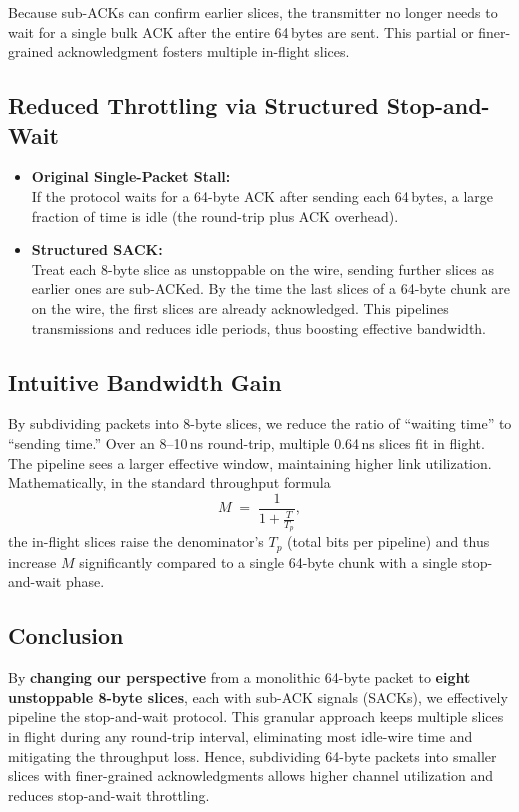 Because sub-ACKs can confirm earlier slices, the transmitter no longer needs to wait for a single bulk ACK after the entire 64\,bytes are sent. This partial or finer-grained acknowledgment fosters multiple in-flight slices.

\subsection{Reduced Throttling via Structured Stop-and-Wait}

\begin{itemize}
\item \textbf{Original Single-Packet Stall:}\\
If the protocol waits for a 64-byte ACK after sending each 64\,bytes, a large fraction of time is idle (the round-trip plus ACK overhead).

\item \textbf{Structured SACK:}\\
Treat each 8-byte slice as unstoppable on the wire, sending further slices as earlier ones are sub-ACKed.  By the time the last slices of a 64-byte chunk are on the wire, the first slices are already acknowledged. This pipelines transmissions and reduces idle periods, thus boosting effective bandwidth.
\end{itemize}

\subsection{Intuitive Bandwidth Gain}

By subdividing packets into 8-byte slices, we reduce the ratio of ``waiting time'' to ``sending time.'' Over an 8--10\,ns round-trip, multiple 0.64\,ns slices fit in flight.  The pipeline sees a larger effective window, maintaining higher link utilization.  Mathematically, in the standard throughput formula 
\[
M \;=\; \frac{1}{1 + \frac{T}{T_p}},
\]
the in-flight slices raise the denominator's $T_p$ (total bits per pipeline) and thus increase $M$ significantly compared to a single 64-byte chunk with a single stop-and-wait phase.

\subsection{Conclusion}

By \textbf{changing our perspective} from a monolithic 64-byte packet to \textbf{eight unstoppable 8-byte slices}, each with sub-ACK signals (SACKs), we effectively pipeline the stop-and-wait protocol. This granular approach keeps multiple slices in flight during any round-trip interval, eliminating most idle-wire time and mitigating the throughput loss. Hence, subdividing 64-byte packets into smaller slices with finer-grained acknowledgments allows higher channel utilization and reduces stop-and-wait throttling.

